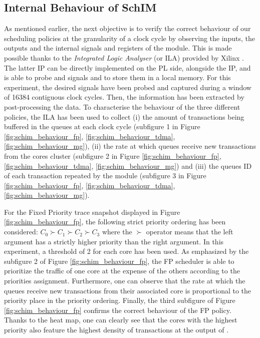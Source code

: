   \subsection{Internal Behaviour of SchIM}
    \label{subsec:internal-behaviour-of-schim}    
    As mentioned earlier, the next objective is to verify the correct behaviour of our scheduling policies at the granularity of a clock cycle by observing the inputs, the outputs and the internal signals and registers of the \schim module.
    This is made possible thanks to the \emph{Integrated Logic Analyser} (or ILA) provided by Xilinx \cite{Xilinx-ILA}. The latter IP can be directly implemented on the PL side, alongside the \schim IP, and is able to probe and signals and to store them in a local memory. For this experiment, the desired signals have been probed and captured during a window of 16384 contiguous clock cycles. Then, the information has been extracted by post-processing the data.
    To characterise the behaviour of the three different policies, the ILA has been used to collect (i) the amount of transactions being buffered in the queues at each clock cycle (subfigure 1 in Figure \ref{fig:schim_behaviour_fp}, \ref{fig:schim_behaviour_tdma}, \ref{fig:schim_behaviour_mg}), (ii) the rate at which queues receive new transactions from the cores cluster (subfigure 2 in Figure \ref{fig:schim_behaviour_fp}, \ref{fig:schim_behaviour_tdma}, \ref{fig:schim_behaviour_mg}) and (iii) the queues ID of each transaction repeated by the \schim module (subfigure 3 in Figure \ref{fig:schim_behaviour_fp}, \ref{fig:schim_behaviour_tdma}, \ref{fig:schim_behaviour_mg}).
    
    For the Fixed Priority trace snapshot displayed in Figure \ref{fig:schim_behaviour_fp}, the following strict priority ordering has been considered: $C_{0} \succ C_{1} \succ C_{2} \succ C_{3}$ where the $\succ$ operator means that the left argument has a strictly higher priority than the right argument. In this experiment, a threshold of 2 for each core has been used.
    As emphasized by the subfigure 2 of Figure \ref{fig:schim_behaviour_fp}, the FP scheduler is able to prioritize the traffic of one core at the expense of the others according to the priorities assignment. Furthermore, one can observe that the rate at which the queues receive new transactions from their associated core is proportional to the priority place in the priority ordering.
    Finally, the third subfigure of Figure \ref{fig:schim_behaviour_fp} confirms the correct behaviour of the FP policy. Thanks to the heat map, one can clearly see that the cores with the highest priority also feature the highest density of transactions at the output of \schim.
    
